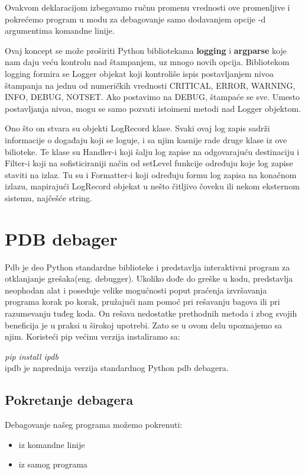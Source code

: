 \documentclass[a4paper]{article}
\begin{document}
Ovakvom deklaracijom izbegavamo ručnu promenu vrednosti ove promenljive i pokrećemo program u modu za debagovanje samo dodavanjem opcije -d argumentima komandne linije. 

Ovaj koncept se može proširiti Python bibliotekama \textbf{logging} \cite{logDocPyt} i \textbf{argparse} koje nam daju veću kontrolu nad štampanjem, uz mnogo novih opcija. Bibliotekom logging formira se Logger objekat koji kontroliše ispis postavljanjem nivoa štampanja na jednu od numeričkih vrednosti CRITICAL, ERROR, WARNING,  INFO, DEBUG, NOTSET. Ako postavimo na DEBUG, štampaće se sve. Umesto postavljanja nivoa, mogu se samo pozvati istoimeni metodi nad Logger objektom.

Ono što on stvara su objekti LogRecord klase. Svaki ovaj log zapis sadrži informacije o događaju koji se loguje, i sa njim kasnije rade druge klase iz ove bilioteke. Te klase su Handler-i koji šalju log zapise na odgovarajuću destinaciju i Filter-i koji na sofisticiraniji način od setLevel funkcije određuju koje log zapise staviti na izlaz. Tu su i Formatter-i koji određuju formu log zapisa na konačnom izlazu, mapirajući LogRecord objekat u nešto čitljivo čoveku ili nekom eksternom sistemu, najčešće string. 

\section{PDB debager}
Pdb je deo Python standardne biblioteke i predstavlja interaktivni program za otklanjanje grešaka(eng. debugger)\cite{pdbDocPyt}. Ukoliko dođe do greške u kodu, predstavlja neophodan alat i poseduje velike mogućnosti poput praćenja izvršavanja programa korak po korak, pružajući nam pomoć pri rešavanju bagova ili pri razumevanju tuđeg koda. On rešava nedostatke prethodnih metoda i zbog svojih beneficija je u praksi u širokoj upotrebi. Zato se u ovom delu upoznajemo sa njim. Koristeći pip većinu verzija instaliramo sa:

\emph{pip install ipdb}\\
ipdb je naprednija verzija standardnog Python pdb debagera.
\subsection{Pokretanje debagera}
Debagovanje našeg programa možemo pokrenuti:
\begin{itemize}
\item iz komandne linije
\item iz samog programa
\end{itemize}
\end{document}
